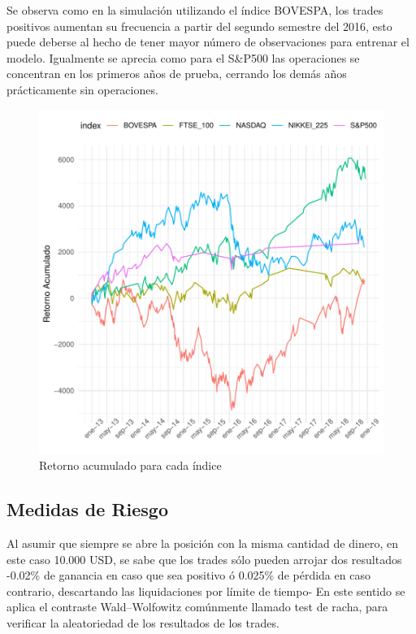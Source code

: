 \documentclass[a4paper,12pt]{Latex/Classes/PhDthesisPSnPDF}
\begin{document}
Se observa como en la simulación utilizando el índice BOVESPA, los trades positivos aumentan su frecuencia a partir del segundo semestre del 2016, esto puede deberse al hecho de tener mayor número de observaciones para entrenar el modelo. Igualmente se aprecia como para el S\&P500 las operaciones se concentran en los primeros años de prueba, cerrando los demás años prácticamente sin operaciones.


\begin{figure}[H]
\centering
\includegraphics{main-031}
\caption{Retorno acumulado para cada índice}
\end{figure}

\subsection{Medidas de Riesgo}

Al asumir que siempre se abre la posición con la misma cantidad de dinero, en este caso 10.000 USD, se sabe que los trades sólo pueden arrojar dos resultados -0.02\% de ganancia en caso que sea positivo ó 0.025\% de pérdida en caso contrario, descartando las liquidaciones por límite de tiempo- En este sentido se aplica el contraste Wald–Wolfowitz comúnmente llamado test de racha, para verificar la aleatoriedad de los resultados de los trades.
\end{document}
